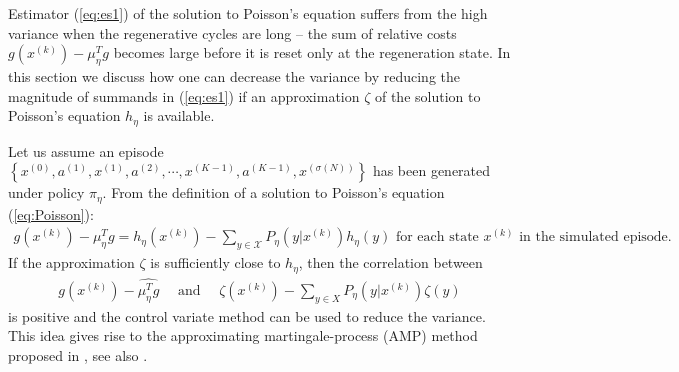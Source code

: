\documentclass[11pt]{article}
\newcommand{\X}{\mathcal{X}}
\theoremstyle{definition}
\numberwithin{equation}{section}
\begin{document}
Estimator (\ref{eq:es1}) of  the solution to Poisson's equation suffers from the high variance when the regenerative cycles are long -- the sum of relative costs $g(x^{(k)}) - \mu_\eta^Tg$   becomes large before it is reset only at the regeneration state.   In this section we discuss how one can decrease  the variance by reducing the magnitude of summands in (\ref{eq:es1}) if  an approximation $\zeta$  of the solution to Poisson's equation $ h_\eta$ is available.

Let us assume  an episode $\left\{x^{(0)}, a^{(1)}, x^{(1)}, a^{(2)}, \cdots, x^{(K-1)}, a^{(K-1)}, x^{(\sigma(N))}\right\}$ has been generated under policy $\pi_\eta$. From the definition of a solution to Poisson's equation (\ref{eq:Poisson}):
\begin{align*}
g(x^{(k) }) - \mu_\eta^Tg =  h_\eta(x^{(k)})-\sum\limits_{y\in \X}P_\eta\left(y| x^{(k)}\right) h_\eta(y) \text{ for each state } x^{(k)}  \text{ in the simulated episode.}
 \end{align*}
If the approximation $\zeta$ is sufficiently close to $ h_\eta$, then the correlation between
\begin{align*}
g(x^{(k) }) -  \widehat {\mu^T_\eta g}  \quad \text{ and }\quad  \zeta(x^{(k)})-\sum\limits_{y\in X} P_\eta\left(y| x^{(k)}\right) \zeta(y)
\end{align*}
is positive and the control variate method can be used to reduce the variance. This idea gives rise to the approximating martingale-process (AMP) method proposed in \cite{Henderson2002}, see also \cite{Andradottir1993}.
\end{document}
